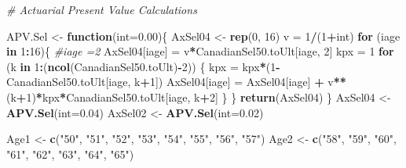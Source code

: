 \documentclass[
]{book}
\newenvironment{Shaded}{\begin{snugshade}}{\end{snugshade}}
\newcommand{\CommentTok}[1]{\textcolor[rgb]{0.56,0.35,0.01}{\textit{#1}}}
\newcommand{\ControlFlowTok}[1]{\textcolor[rgb]{0.13,0.29,0.53}{\textbf{#1}}}
\newcommand{\DataTypeTok}[1]{\textcolor[rgb]{0.13,0.29,0.53}{#1}}
\newcommand{\DecValTok}[1]{\textcolor[rgb]{0.00,0.00,0.81}{#1}}
\newcommand{\FloatTok}[1]{\textcolor[rgb]{0.00,0.00,0.81}{#1}}
\newcommand{\KeywordTok}[1]{\textcolor[rgb]{0.13,0.29,0.53}{\textbf{#1}}}
\newcommand{\NormalTok}[1]{#1}
\newcommand{\OperatorTok}[1]{\textcolor[rgb]{0.81,0.36,0.00}{\textbf{#1}}}
\newcommand{\StringTok}[1]{\textcolor[rgb]{0.31,0.60,0.02}{#1}}
\begin{document}
\begin{Shaded}
\begin{Highlighting}[]
\CommentTok{#  Actuarial Present Value Calculations}

\NormalTok{APV.Sel <-}\StringTok{ }\ControlFlowTok{function}\NormalTok{(}\DataTypeTok{int=}\FloatTok{0.00}\NormalTok{)\{}
\NormalTok{AxSel04 <-}\StringTok{ }\KeywordTok{rep}\NormalTok{(}\DecValTok{0}\NormalTok{, }\DecValTok{16}\NormalTok{)}
\NormalTok{  v =}\StringTok{ }\DecValTok{1}\OperatorTok{/}\NormalTok{(}\DecValTok{1}\OperatorTok{+}\NormalTok{int)}
\ControlFlowTok{for}\NormalTok{ (iage }\ControlFlowTok{in} \DecValTok{1}\OperatorTok{:}\DecValTok{16}\NormalTok{)\{}
\CommentTok{#iage =2}
\NormalTok{  AxSel04[iage] =}\StringTok{  }\NormalTok{v}\OperatorTok{*}\NormalTok{CanadianSel50.toUlt[iage, }\DecValTok{2}\NormalTok{]}
\NormalTok{kpx =}\StringTok{ }\DecValTok{1}
  \ControlFlowTok{for}\NormalTok{ (k }\ControlFlowTok{in} \DecValTok{1}\OperatorTok{:}\NormalTok{(}\KeywordTok{ncol}\NormalTok{(CanadianSel50.toUlt)}\OperatorTok{-}\DecValTok{2}\NormalTok{)) \{}
\NormalTok{    kpx =}\StringTok{ }\NormalTok{kpx}\OperatorTok{*}\NormalTok{(}\DecValTok{1}\OperatorTok{-}\NormalTok{CanadianSel50.toUlt[iage, k}\OperatorTok{+}\DecValTok{1}\NormalTok{])}
\NormalTok{   AxSel04[iage] =}\StringTok{  }\NormalTok{AxSel04[iage] }\OperatorTok{+}\StringTok{ }\NormalTok{v}\OperatorTok{**}\NormalTok{(k}\OperatorTok{+}\DecValTok{1}\NormalTok{)}\OperatorTok{*}\NormalTok{kpx}\OperatorTok{*}\NormalTok{CanadianSel50.toUlt[iage, k}\OperatorTok{+}\DecValTok{2}\NormalTok{]}
\NormalTok{  \}}
\NormalTok{\}}
\KeywordTok{return}\NormalTok{(AxSel04)}
\NormalTok{\}}
\NormalTok{AxSel04 <-}\StringTok{ }\KeywordTok{APV.Sel}\NormalTok{(}\DataTypeTok{int=}\FloatTok{0.04}\NormalTok{)}
\NormalTok{AxSel02 <-}\StringTok{ }\KeywordTok{APV.Sel}\NormalTok{(}\DataTypeTok{int=}\FloatTok{0.02}\NormalTok{)}

\NormalTok{Age1 <-}\StringTok{ }\KeywordTok{c}\NormalTok{(}\StringTok{"50"}\NormalTok{, }\StringTok{"51"}\NormalTok{, }\StringTok{"52"}\NormalTok{, }\StringTok{"53"}\NormalTok{, }\StringTok{"54"}\NormalTok{, }\StringTok{"55"}\NormalTok{, }\StringTok{"56"}\NormalTok{, }\StringTok{"57"}\NormalTok{)}
\NormalTok{Age2 <-}\StringTok{ }\KeywordTok{c}\NormalTok{(}\StringTok{"58"}\NormalTok{, }\StringTok{"59"}\NormalTok{, }\StringTok{"60"}\NormalTok{, }\StringTok{"61"}\NormalTok{, }\StringTok{"62"}\NormalTok{, }\StringTok{"63"}\NormalTok{, }\StringTok{"64"}\NormalTok{, }\StringTok{"65"}\NormalTok{)}


\end{Highlighting}
\end{Shaded}
\end{document}
